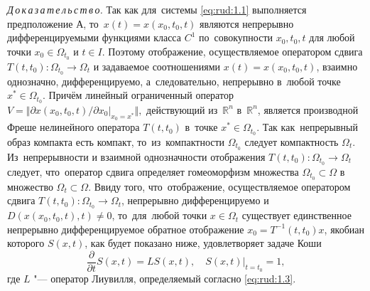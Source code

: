 \textit{Д\,о\,к\,а\,з\,а\,т\,е\,л\,ь\,с\,т\,в\,о.}
 Так как для~системы \eqref{eq:rud:1.1} выполняется
 предположение А, то~$x(t)=x(x_0,t_0,t)$ являются
 непрерывно дифференцируемыми функциями класса $C^1$ по~совокупности
 $x_0,t_0,t$ для любой точки $x_0\in\Omega_{t_0}$ и $t\in
 I$. 
 Поэтому отображение, осуществляемое оператором сдвига  $T(t,t_0):\Omega_{t_0}\to \Omega_t$ и задаваемое соотношениями
 $x(t)=x(x_0,t_0,t)$, взаимно однозначно, дифференцируемо, а~следовательно, непрерывно в~любой
 точке $x^*\in\Omega_{t_0}$. 
 Причём  линейный ограниченный оператор $V=\bigr\Vert {\partial  x(x_0,t_0,t)}/{\partial x_0}\bigr|_{x_0=x^*}\bigr\Vert,$ действующий
 из~$\mathbb R^n$ в~$\mathbb R^n$, является производной Фреше нелинейного
 оператора $T(t,t_0)$ в~точке $x^*\in\Omega_{t_0}$. Так как~непрерывный
 образ компакта есть компакт, то~из~компактности $\Omega_{t_0}$
 следует компактность $\Omega_t$. Из~непрерывности и взаимной
 однозначности отображения $T(t,t_0):\Omega_{t_0}\to \Omega_t$
 следует, что~оператор сдвига определяет гомеоморфизм множества
 $\Omega_{t_0}\subset\Omega$ в множество $\Omega_t\subset\Omega$.
 Ввиду того, что~отображение, осуществляемое оператором сдвига
 $T(t,t_0):\Omega_{t_0}\to \Omega_t$, непрерывно дифференцируемо
 и \mbox{$D(x(x_0,t_0,t),t)\ne 0$}, то~для~любой точки $x\in\Omega_t$
 существует единственное непрерывно дифференцируемое обратное
 отображение $x_0=T^{-1}(t,t_0)x$, якобиан которого $S(x,t)$, как
 будет показано ниже, удовлетворяет задаче Коши
 \begin{equation}
 \frac{\partial}{\partial t}S(x,t)=LS(x,t),\quad 
 S(x,t)|_{t=t_0}=1,\label{eq:rud:1.11}
 \end{equation}
 где $L$ "--- оператор Лиувилля, определяемый согласно \eqref{eq:rud:1.3}.

